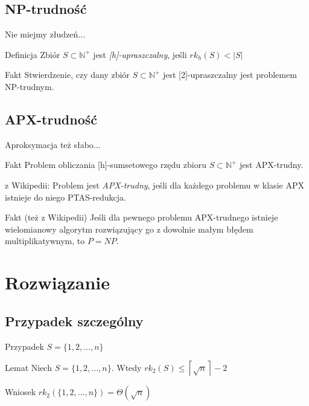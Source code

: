 \documentclass{beamer}
\newcommand{\N}{\mathbb{N}}
\begin{document}
	\subsection{NP-trudność}
		\begin{frame}{Nie miejmy złudzeń...}
			\begin{block}{Definicja}
				Zbiór $ S \subset \N^{+} $ jest \emph{[h]-upraszczalny}, jeśli $ rk_{h}(S) < |S| $
			\end{block}
			
			\begin{exampleblock}{Fakt}
				Stwierdzenie, czy dany zbiór $ S \subset \N^{+} $ jest [2]-upraszczalny jest problemem NP-trudnym.
			\end{exampleblock}
		\end{frame}
		
	\subsection{APX-trudność}
		\begin{frame}{Aproksymacja też słabo...}
			\begin{exampleblock}{Fakt}
				Problem obliczania [h]-sumsetowego rzędu zbioru $ S \subset \N^{+} $ jest APX-trudny.
			\end{exampleblock}			
			
			\pause
			\begin{block}{z Wikipedii:}
				Problem jest \emph{APX-trudny}, jeśli dla każdego problemu w klasie APX istnieje do niego PTAS-redukcja.
			\end{block}						
			
			\pause
			\begin{exampleblock}{Fakt (też z Wikipedii)}
				Jeśli dla pewnego problemu APX-trudnego istnieje wielomianowy algorytm rozwiązujący go z dowolnie małym błędem multiplikatywnym, to $ P = NP $.
			\end{exampleblock}
			
		\end{frame}
		
\section{Rozwiązanie}
	\subsection{Przypadek szczególny}
		\begin{frame}{Przypadek $ S = \lbrace 1,2,...,n \rbrace $}
			\begin{exampleblock}{Lemat}			
				Niech $ S = \lbrace 1,2,...,n \rbrace $. Wtedy $ rk_{2}(S) \leq \left\lceil \sqrt{n} \right\rceil - 2 $
			\end{exampleblock}
						
			
			\pause			
			\vspace{\baselineskip}
			\begin{exampleblock}{Wniosek}			
				$ rk_{2}\left( \lbrace 1,2,...,n \rbrace \right) = \Theta(\sqrt{n}) $
			\end{exampleblock}
		\end{frame}
		
\end{document}
